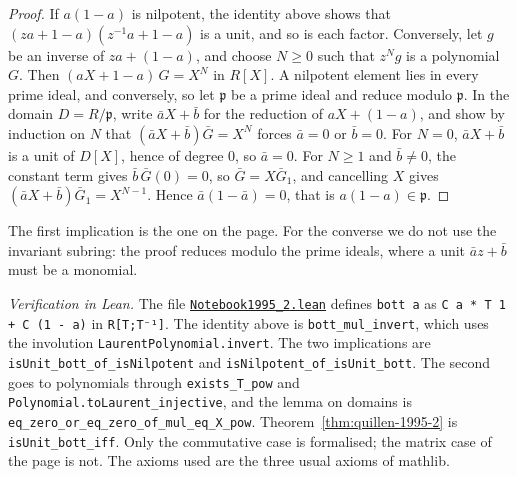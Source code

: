 \begin{proof}
If $a(1 - a)$ is nilpotent, the identity above shows that $(za + 1 - a)(z^{-1}a + 1 - a)$ is a unit, and so is each factor. Conversely, let $g$ be an inverse of $za + (1 - a)$, and choose $N \ge 0$ such that $z^N g$ is a polynomial $G$. Then $(aX + 1 - a)\,G = X^N$ in $R[X]$. A nilpotent element lies in every prime ideal, and conversely, so let $\mathfrak p$ be a prime ideal and reduce modulo $\mathfrak p$. In the domain $D = R/\mathfrak p$, write $\bar a X + \bar b$ for the reduction of $aX + (1 - a)$, and show by induction on $N$ that $(\bar aX + \bar b)\bar G = X^N$ forces $\bar a = 0$ or $\bar b = 0$. For $N = 0$, $\bar aX + \bar b$ is a unit of $D[X]$, hence of degree $0$, so $\bar a = 0$. For $N \ge 1$ and $\bar b \neq 0$, the constant term gives $\bar b\,\bar G(0) = 0$, so $\bar G = X\bar G_1$, and cancelling $X$ gives $(\bar aX + \bar b)\bar G_1 = X^{N-1}$. Hence $\bar a(1 - \bar a) = 0$, that is $a(1 - a) \in \mathfrak p$.
\end{proof}

\noindent The first implication is the one on the page. For the converse we do not use the invariant subring: the proof reduces modulo the prime ideals, where a unit $\bar a z + \bar b$ must be a monomial.

\emph{Verification in Lean.} The file \href{\leanblobmain/Notebook1995_2.lean}{\texttt{Notebook1995\_2.\allowbreak{}lean}} defines \texttt{bott a} as \texttt{C a * T 1 + C (1 - a)} in \texttt{R[T;T⁻¹]}. The identity above is \texttt{bott\_mul\_invert}, which uses the involution \texttt{LaurentPolynomial.invert}. The two implications are \texttt{isUnit\_bott\_of\_isNilpotent} and \texttt{isNilpotent\_of\_isUnit\_bott}. The second goes to polynomials through \texttt{exists\_T\_pow} and \texttt{Polynomial.toLaurent\_injective}, and the lemma on domains is \texttt{eq\_zero\_or\_eq\_zero\_of\_mul\_eq\_X\_pow}. Theorem~\ref{thm:quillen-1995-2} is \texttt{isUnit\_bott\_iff}. Only the commutative case is formalised; the matrix case of the page is not. The axioms used are the three usual axioms of mathlib.

